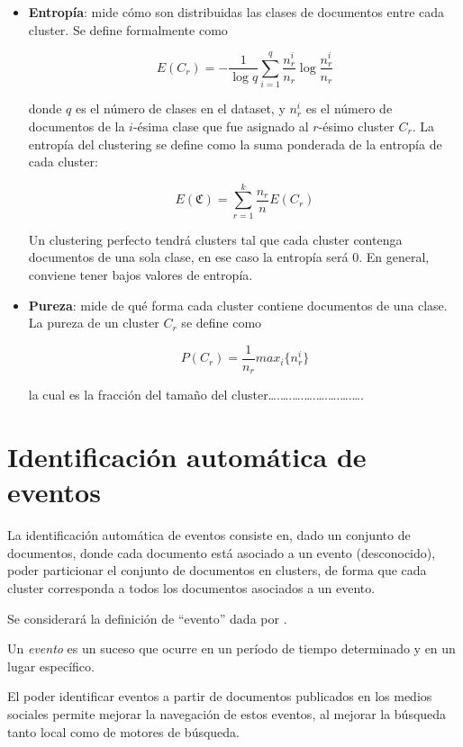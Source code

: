 \documentclass[upright, contnum]{umemoria}
\begin{document}
\begin{itemize}
\item \textbf{Entropía}: mide cómo son distribuidas las clases de documentos
      entre cada cluster. Se define formalmente como
      
      $$E(C_r) = -\frac{1}{\log q}\sum_{i=1}^q\frac{n^i_r}{n_r}\log\frac{n^i_r}{n_r}$$

      donde $q$ es el número de clases en el dataset, y $n^i_r$ es el
      número de documentos de la $i$-ésima clase que fue asignado al
      $r$-ésimo cluster $C_r$. La entropía del clustering se define
      como la suma ponderada de la entropía de cada cluster:

      $$E(\mathfrak{C}) = \sum_{r=1}^k \frac{n_r}{n} E(C_r)$$

      Un clustering perfecto tendrá clusters tal que cada cluster
      contenga documentos de una sola clase, en ese caso la entropía
      será 0. En general, conviene tener bajos valores de entropía.
\item \textbf{Pureza}: mide de qué forma cada cluster contiene documentos de
      una clase. La pureza de un cluster $C_r$ se define como

      $$P(C_r) = \frac{1}{n_r} max_i\{n^i_r\}$$

      la cual es la fracción del tamaño del cluster\ldots{}.\ldots{}.\ldots{}.\ldots{}.\ldots{}.\ldots{}.\ldots{}.\ldots{}.
\end{itemize}
\section{Identificación automática de eventos}
\label{sec-2.3}


   La identificación automática de eventos consiste en, dado un
   conjunto de documentos, donde cada documento está asociado a un
   evento (desconocido), poder particionar el conjunto de
   documentos en clusters, de forma que cada cluster corresponda a
   todos los documentos asociados a un evento.

   Se considerará la definición de ``evento'' dada por \cite{Yang:1999:LAD:630307.630471}. 

   \begin{defn} Un \emph{evento} es un suceso que ocurre en un período de tiempo
   determinado y en un lugar específico. \end{defn}

   El poder identificar eventos a partir de documentos publicados en
   los medios sociales permite mejorar la navegación de estos eventos,
   al mejorar la búsqueda tanto local como de motores de búsqueda.
\end{document}
